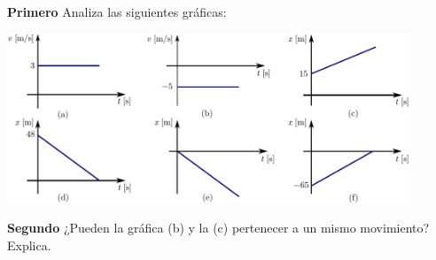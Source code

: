 \begin{comprension}
  \noindent
  {\bf Primero}  Analiza las siguientes gráficas:
  \begin{center}
    \includegraphics[width=0.9\textwidth]{img/analisisMRU.pdf}
  \end{center}

 \noindent
  {\bf Segundo} ¿Pueden la gráfica (b) y la (c) pertenecer a un mismo movimiento? Explica.
\end{comprension}
